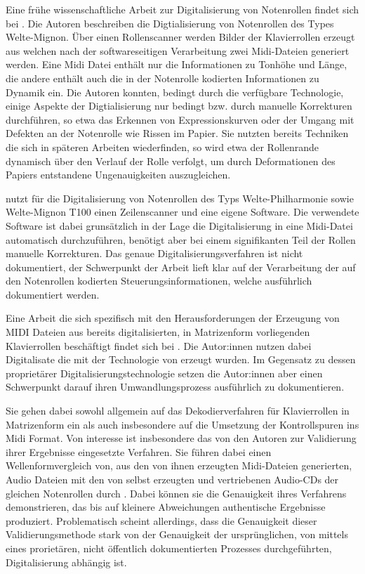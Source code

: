 Eine frühe wissenschaftliche Arbeit zur Digitalisierung von Notenrollen findet sich bei \textcite[]{zoltan_1994}.
Die Autoren beschreiben die Digtialisierung von Notenrollen des Types Welte-Mignon.
Über einen Rollenscanner werden Bilder der Klavierrollen erzeugt aus welchen nach der softwareseitigen Verarbeitung zwei Midi-Dateien generiert werden.
Eine Midi Datei enthält nur die Informationen zu Tonhöhe und Länge, die andere enthält auch die in der Notenrolle kodierten Informationen zu Dynamik ein.
Die Autoren konnten, bedingt durch die verfügbare Technologie, einige Aspekte der Digtialisierung nur bedingt bzw. durch manuelle Korrekturen durchführen, so etwa das Erkennen von Expressionskurven oder der Umgang mit Defekten an der Notenrolle wie Rissen im Papier.
Sie nutzten bereits Techniken die sich in späteren Arbeiten wiederfinden, so wird etwa der Rollenrande dynamisch über den Verlauf der Rolle verfolgt, um durch Deformationen des Papiers entstandene Ungenauigkeiten auszugleichen.

\textcite[]{debrunner_201300} nutzt für die Digitalisierung von Notenrollen des Typs Welte-Philharmonie sowie Welte-Mignon T100 einen Zeilenscanner und eine eigene Software.
Die verwendete Software ist dabei grunsätzlich in der Lage die Digitalisierung in eine Midi-Datei automatisch durchzuführen, benötigt aber bei einem signifikanten Teil der Rollen manuelle Korrekturen.
Das genaue Digitalisierungsverfahren ist nicht dokumentiert, der Schwerpunkt der Arbeit lieft klar auf der Verarbeitung der auf den Notenrollen kodierten Steuerungsinformationen, welche ausführlich dokumentiert werden.

Eine Arbeit die sich spezifisch mit den Herausforderungen der Erzeugung von MIDI Dateien aus bereits digitalisierten, in Matrizenform vorliegenden Klavierrollen beschäftigt findet sich bei \textcite[]{colmenares_2011}.
Die Autor:innen nutzen dabei Digitalisate die mit der Technologie von \textcite[]{stahnke_1996} erzeugt wurden.
Im Gegensatz zu dessen proprietärer Digitalisierungstechnologie setzen die Autor:innen aber einen Schwerpunkt darauf  ihren Umwandlungsprozess ausführlich zu dokumentieren.

Sie gehen dabei sowohl allgemein auf das Dekodierverfahren für Klavierrollen in Matrizenform ein als auch insbesondere auf die Umsetzung der Kontrollspuren ins Midi Format.
Von interesse ist insbesondere das von den Autoren zur Validierung ihrer Ergebnisse eingesetzte Verfahren.
Sie führen dabei einen Wellenformvergleich von, aus den von ihnen erzeugten Midi-Dateien generierten, Audio Dateien mit den von \textcite[]{stahnke_1996} selbst erzeugten und vertriebenen Audio-CDs der gleichen Notenrollen durch \parencite[70ff]{colmenares_2011}.
Dabei können sie die Genauigkeit ihres Verfahrens demonstrieren, das bis auf kleinere Abweichungen authentische Ergebnisse produziert.
Problematisch scheint allerdings, dass die Genauigkeit dieser Validierungsmethode stark von der Genauigkeit der ursprünglichen, von \textcite[]{stahnke_1996} mittels eines prorietären, nicht öffentlich dokumentierten Prozesses durchgeführten, Digitalisierung abhängig ist.

